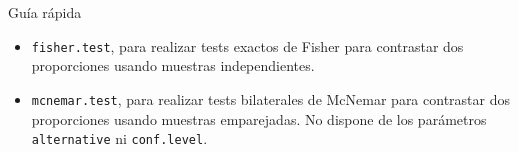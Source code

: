 \documentclass[
  ignorenonframetext,
]{beamer}
\begin{document}
\begin{frame}[fragile]{Guía rápida}
\protect\hypertarget{guuxeda-ruxe1pida-3}{}
\begin{itemize}[<+->]
\item
  \texttt{fisher.test}, para realizar tests exactos de Fisher para
  contrastar dos proporciones usando muestras independientes.
\item
  \texttt{mcnemar.test}, para realizar tests bilaterales de McNemar para
  contrastar dos proporciones usando muestras emparejadas. No dispone de
  los parámetros \texttt{alternative} ni \texttt{conf.level}.
\end{itemize}
\end{frame}
\end{document}
